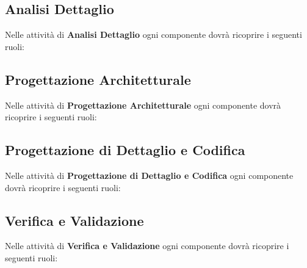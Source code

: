 \subsection{Analisi Dettaglio}
Nelle attività di \textbf{Analisi Dettaglio} ogni componente dovrà ricoprire i seguenti ruoli:

\subsection{Progettazione Architetturale}
Nelle attività di \textbf{Progettazione Architetturale} ogni componente dovrà ricoprire i seguenti ruoli:

\subsection{Progettazione di Dettaglio e Codifica}
Nelle attività di \textbf{Progettazione di Dettaglio e Codifica} ogni componente dovrà ricoprire i seguenti ruoli:

\subsection{Verifica e Validazione}
Nelle attività di \textbf{Verifica e Validazione} ogni componente dovrà ricoprire i seguenti ruoli:
